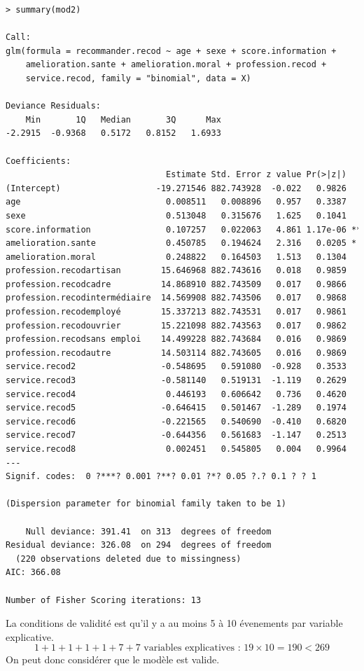 \begin{lstlisting}[language=html]
> summary(mod2)

Call:
glm(formula = recommander.recod ~ age + sexe + score.information + 
    amelioration.sante + amelioration.moral + profession.recod + 
    service.recod, family = "binomial", data = X)

Deviance Residuals: 
    Min       1Q   Median       3Q      Max  
-2.2915  -0.9368   0.5172   0.8152   1.6933  

Coefficients:
                                Estimate Std. Error z value Pr(>|z|)    
(Intercept)                   -19.271546 882.743928  -0.022   0.9826    
age                             0.008511   0.008896   0.957   0.3387    
sexe                            0.513048   0.315676   1.625   0.1041    
score.information               0.107257   0.022063   4.861 1.17e-06 ***
amelioration.sante              0.450785   0.194624   2.316   0.0205 *  
amelioration.moral              0.248822   0.164503   1.513   0.1304    
profession.recodartisan        15.646968 882.743616   0.018   0.9859    
profession.recodcadre          14.868910 882.743509   0.017   0.9866    
profession.recodintermédiaire  14.569908 882.743506   0.017   0.9868    
profession.recodemployé        15.337213 882.743531   0.017   0.9861    
profession.recodouvrier        15.221098 882.743563   0.017   0.9862    
profession.recodsans emploi    14.499228 882.743684   0.016   0.9869    
profession.recodautre          14.503114 882.743605   0.016   0.9869    
service.recod2                 -0.548695   0.591080  -0.928   0.3533    
service.recod3                 -0.581140   0.519131  -1.119   0.2629    
service.recod4                  0.446193   0.606642   0.736   0.4620    
service.recod5                 -0.646415   0.501467  -1.289   0.1974    
service.recod6                 -0.221565   0.540690  -0.410   0.6820    
service.recod7                 -0.644356   0.561683  -1.147   0.2513    
service.recod8                  0.002451   0.545805   0.004   0.9964    
---
Signif. codes:  0 ?***? 0.001 ?**? 0.01 ?*? 0.05 ?.? 0.1 ? ? 1

(Dispersion parameter for binomial family taken to be 1)

    Null deviance: 391.41  on 313  degrees of freedom
Residual deviance: 326.08  on 294  degrees of freedom
  (220 observations deleted due to missingness)
AIC: 366.08

Number of Fisher Scoring iterations: 13
\end{lstlisting}

La conditions de validité est qu'il y a au moins  5 à 10 évenements par variable explicative.
$$1+1+1+1+1+7+7 \textrm{ variables explicatives : } 19\times 10 = 190 < 269$$
On peut donc considérer que le modèle est valide.
 \newpage
 
